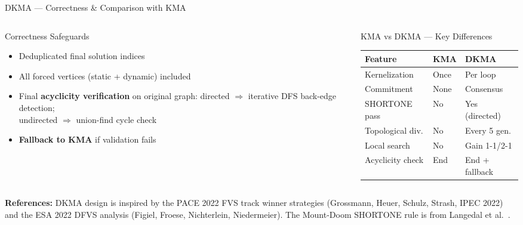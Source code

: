 \documentclass[aspectratio=169,10pt]{beamer}
\newcommand{\red}[1]{\textcolor{alertred}{\textbf{#1}}}
\renewcommand{\footnotesize}{\tiny}
\begin{document}
\begin{frame}{DKMA — Correctness \& Comparison with KMA}
  \begin{columns}[T]
    \begin{column}{0.44\textwidth}
      \begin{block}{Correctness Safeguards}
        \begin{itemize}\setlength\itemsep{2pt}
          \item Deduplicated final solution indices
          \item All forced vertices (static + dynamic) included
          \item Final \textbf{acyclicity verification} on original graph:
            directed $\Rightarrow$ iterative DFS back-edge detection;\\
            undirected $\Rightarrow$ union-find cycle check
          \item \red{Fallback to KMA} if validation fails
        \end{itemize}
      \end{block}
    \end{column}
    \begin{column}{0.52\textwidth}
      \begin{block}{KMA vs DKMA — Key Differences}
        \begin{tabular}{p{2.6cm}p{2.0cm}p{2.0cm}}
          \toprule
          Feature & KMA & DKMA\\
          \midrule
          Kernelization & Once & Per loop\\
          Commitment & None & Consensus\\
          SHORTONE pass & No & Yes (directed)\\
          Topological div. & No & Every 5 gen.\\
          Local search & No & Gain 1-1/2-1\\
          Acyclicity check & End & End + fallback\\
          \bottomrule
        \end{tabular}
      \end{block}
    \end{column}
  \end{columns}
  \vspace{4pt}
  \begin{tcolorbox}[orangebox,fontupper=\footnotesize]
    \textbf{References:} DKMA design is inspired by the PACE 2022 FVS track
    winner strategies \cite{pace2022} (Grossmann, Heuer, Schulz, Strash, IPEC 2022)
    and the ESA 2022 DFVS analysis \cite{esa2022}
    (Figiel, Froese, Nichterlein, Niedermeier).
    The Mount-Doom SHORTONE rule is from Langedal et al.\ \cite{langedal2022}.
  \end{tcolorbox}
\end{frame}
\end{document}
